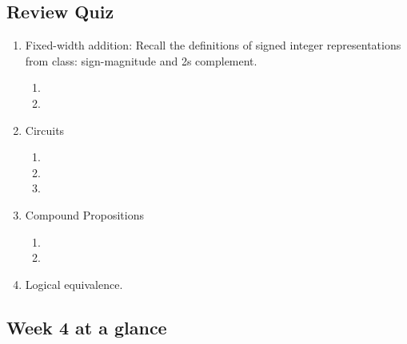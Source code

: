 \subsection*{Review Quiz}
\begin{enumerate}
    \item Fixed-width addition: Recall the definitions of signed integer representations from class: 
    sign-magnitude and 2s complement.    
        \begin{enumerate}
            \item {}
            \item {}
        \end{enumerate}
    \newpage
    \item Circuits
        \begin{enumerate}
            \item {}
            \item {}
            \item 
        \end{enumerate}
    \item Compound Propositions
        \begin{enumerate}
            \item 
            \item 
        \end{enumerate}
    \item Logical equivalence.
    
\end{enumerate}

\newpage

\subsection*{Week 4 at a glance}

